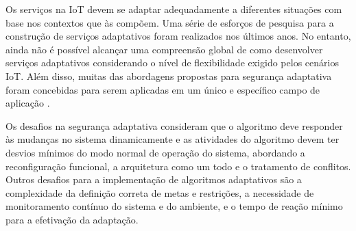 \documentclass[tid,table]{texufpel} %
\begin{document}
Os serviços na IoT devem se adaptar adequadamente a diferentes situações com base nos contextos que às compõem. Uma série de esforços de pesquisa para a construção de serviços adaptativos foram realizados nos últimos anos. No entanto, ainda não é possível alcançar uma compreensão global de como desenvolver serviços adaptativos considerando o nível de flexibilidade exigido pelos cenários IoT. Além disso, muitas das abordagens propostas para segurança adaptativa foram concebidas para serem aplicadas em um único e específico campo de aplicação \cite{miorandi12}.

Os desafios na segurança adaptativa consideram que o algoritmo deve responder às mudanças no sistema dinamicamente e as atividades do algoritmo devem ter desvios mínimos do modo normal de operação do sistema, abordando a reconfiguração funcional, a arquitetura como um todo e o tratamento de conflitos. Outros desafios para a implementação de algoritmos adaptativos são a complexidade da definição correta de metas e restrições, a necessidade de monitoramento contínuo do sistema e do ambiente, e o tempo de reação mínimo para a efetivação da adaptação.
\end{document}
